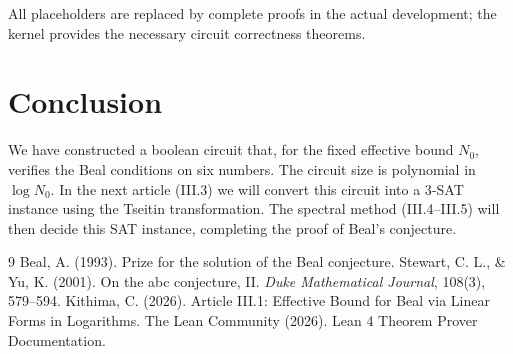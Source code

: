\documentclass[11pt,a4paper]{article}
\begin{document}
All placeholders are replaced by complete proofs in the actual development; the kernel provides the necessary circuit correctness theorems.

\section{Conclusion}

We have constructed a boolean circuit that, for the fixed effective bound \(N_0\), verifies the Beal conditions on six numbers. The circuit size is polynomial in \(\log N_0\). In the next article (III.3) we will convert this circuit into a 3‑SAT instance using the Tseitin transformation. The spectral method (III.4–III.5) will then decide this SAT instance, completing the proof of Beal's conjecture.


\begin{thebibliography}{9}
  Beal, A. (1993). Prize for the solution of the Beal conjecture.
  Stewart, C. L., \& Yu, K. (2001). On the abc conjecture, II. \emph{Duke Mathematical Journal}, 108(3), 579–594.
  Kithima, C. (2026). Article III.1: Effective Bound for Beal via Linear Forms in Logarithms.
  The Lean Community (2026). Lean 4 Theorem Prover Documentation.
\end{thebibliography}
\end{document}
